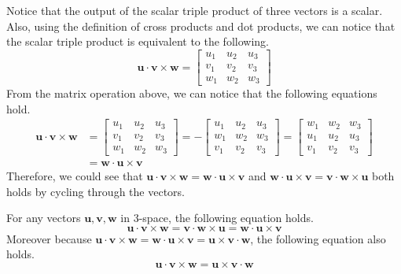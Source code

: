 \documentclass[../../main.tex]{subfiles}
\begin{document}
Notice that the output of the scalar triple product of three
vectors is a scalar. Also, using the definition of cross products
and dot products, we can notice that the scalar triple product
is equivalent to the following.
\[
\mathbf{u} \cdot \mathbf{v} \times \mathbf{w}
=
\begin{bmatrix}
    u_1 & u_2 & u_3 \\
    v_1 & v_2 & v_3 \\
    w_1 & w_2 & w_3
\end{bmatrix}
\]
From the matrix operation above, we can notice that the following
equations hold.
\begin{align*}
    \mathbf{u} \cdot \mathbf{v} \times \mathbf{w}
    &= \begin{bmatrix}
        u_1 & u_2 & u_3 \\
        v_1 & v_2 & v_3 \\
        w_1 & w_2 & w_3
    \end{bmatrix}
    = -\begin{bmatrix}
        u_1 & u_2 & u_3 \\
        w_1 & w_2 & w_3 \\
        v_1 & v_2 & v_3
    \end{bmatrix}
    = \begin{bmatrix}
        w_1 & w_2 & w_3 \\
        u_1 & u_2 & u_3 \\
        v_1 & v_2 & v_3
    \end{bmatrix} \\
    &= \mathbf{w} \cdot \mathbf{u} \times \mathbf{v}
\end{align*}
Therefore, we could see that $\mathbf{u} \cdot \mathbf{v} \times
\mathbf{w} = \mathbf{w} \cdot \mathbf{u} \times \mathbf{v}$ and
$\mathbf{w} \cdot \mathbf{u} \times \mathbf{v} = \mathbf{v} \cdot
\mathbf{w} \times \mathbf{u}$ both holds by cycling through
the vectors.

\begin{important}
For any vectors $\mathbf{u}, \mathbf{v}, \mathbf{w}$ in 3-space,
the following equation holds.
\[
\mathbf{u} \cdot \mathbf{v} \times \mathbf{w}
= \mathbf{v} \cdot \mathbf{w} \times \mathbf{u}
= \mathbf{w} \cdot \mathbf{u} \times \mathbf{v}
\]
Moreover because $\mathbf{u} \cdot \mathbf{v} \times \mathbf{w}
= \mathbf{w} \cdot \mathbf{u} \times \mathbf{v}
= \mathbf{u} \times \mathbf{v} \cdot \mathbf{w}$, the following
equation also holds.
\[
\mathbf{u} \cdot \mathbf{v} \times \mathbf{w}
= \mathbf{u} \times \mathbf{v} \cdot \mathbf{w}
\]
\end{important}
\end{document}
